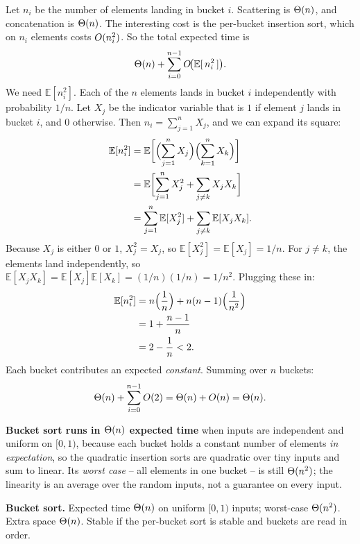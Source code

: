 Let $n_i$ be the number of elements landing in bucket $i$. Scattering is
$\Theta(n)$, and concatenation is $\Theta(n)$. The interesting cost is the per-bucket
insertion sort, which on $n_i$ elements costs $O(n_i^2)$. So the total
expected time is
\[
\Theta(n) + \sum_{i=0}^{n-1} O\!\bigl(\mathbb{E}[\,n_i^2\,]\bigr).
\]
We need $\mathbb{E}[n_i^2]$. Each of the $n$ elements lands in bucket $i$ independently with probability $1/n$. Let $X_j$ be the indicator variable that is $1$ if element $j$ lands in bucket $i$, and $0$ otherwise. Then $n_i = \sum_{j=1}^n X_j$, and we can expand its square:
\begin{align*}
\mathbb{E}[n_i^2] &= \mathbb{E}\biggl[ \Bigl(\sum_{j=1}^n X_j\Bigr) \Bigl(\sum_{k=1}^n X_k\Bigr) \biggr] \\
&= \mathbb{E}\biggl[ \sum_{j=1}^n X_j^2 + \sum_{j \ne k} X_j X_k \biggr] \\
&= \sum_{j=1}^n \mathbb{E}[X_j^2] + \sum_{j \ne k} \mathbb{E}[X_j X_k].
\end{align*}
Because $X_j$ is either $0$ or $1$, $X_j^2 = X_j$, so $\mathbb{E}[X_j^2] = \mathbb{E}[X_j] = 1/n$. For $j \ne k$, the elements land independently, so $\mathbb{E}[X_j X_k] = \mathbb{E}[X_j]\mathbb{E}[X_k] = (1/n)(1/n) = 1/n^2$. Plugging these in:
\begin{align*}
\mathbb{E}[n_i^2] &= n \Bigl(\frac{1}{n}\Bigr) + n(n-1) \Bigl(\frac{1}{n^2}\Bigr) \\
&= 1 + \frac{n-1}{n} \\
&= 2 - \frac{1}{n} < 2.
\end{align*}
Each bucket contributes an expected \emph{constant}. Summing over $n$ buckets:
\[
\Theta(n) + \sum_{i=0}^{n-1}O(2) = \Theta(n) + O(n) = \Theta(n).
\]

\begin{formalbox}
\textbf{Bucket sort runs in $\Theta(n)$ expected time} when inputs are
independent and uniform on $[0,1)$, because each bucket holds a constant number
of elements \emph{in expectation}, so the quadratic insertion sorts are
quadratic over tiny inputs and sum to linear. Its \emph{worst case} -- all
elements in one bucket -- is still $\Theta(n^2)$; the linearity is an average over
the random inputs, not a guarantee on every input.
\end{formalbox}

\begin{complexitybox}
\textbf{Bucket sort.} Expected time $\Theta(n)$ on uniform $[0,1)$ inputs;
worst-case $\Theta(n^2)$. Extra space $\Theta(n)$. Stable if the per-bucket sort is
stable and buckets are read in order.
\end{complexitybox}

